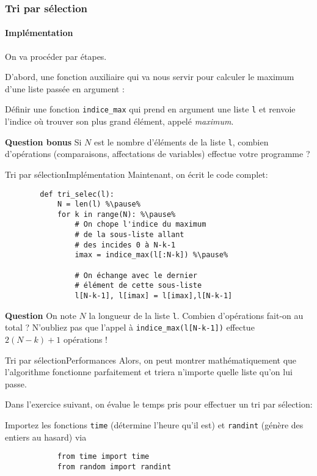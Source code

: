 \begin{frame}
	\frametitle{Tri par sélection}
	\framesubtitle{Implémentation}
	
	On va procéder par étapes.\pause
	
	D'abord, une fonction auxiliaire qui va nous servir pour calculer le maximum d'une liste passée en argument :\pause
	
	\begin{exo}
		Définir une fonction \lstinline|indice_max| qui prend en argument une liste \lstinline|l| et renvoie l'indice où trouver son plus grand élément, appelé \textit{maximum}.
		
		\textbf{Question bonus} Si $N$ est le nombre d'éléments de la liste \lstinline|l|, combien d'opérations (comparaisons, affectations de variables) effectue votre programme ?
	\end{exo}
\end{frame}

\begin{frame}[fragile]{Tri par sélection}{Implémentation}
	Maintenant, on écrit le code complet:\pause
	
	\begin{lstlisting}
		def tri_selec(l):
			N = len(l) %\pause%
			for k in range(N): %\pause%
				# On chope l'indice du maximum
				# de la sous-liste allant
				# des incides 0 à N-k-1
				imax = indice_max(l[:N-k]) %\pause%
				
				# On échange avec le dernier
				# élément de cette sous-liste
				l[N-k-1], l[imax] = l[imax],l[N-k-1]
	\end{lstlisting}
	
	\textbf{Question} On note $N$ la longueur de la liste \lstinline|l|. Combien d'opérations fait-on au total ? N'oubliez pas que l'appel à \lstinline|indice_max(l[N-k-1])| effectue $2(N-k)+1$ opérations ! 
\end{frame}

\begin{frame}[fragile]{Tri par sélection}{Performances}
	Alors, on peut montrer mathématiquement que l'algorithme fonctionne parfaitement et triera n'importe quelle liste qu'on lui passe.\pause
	
	Dans l'exercice suivant, on évalue le temps pris pour effectuer un tri par sélection:\pause
	
	\begin{exo}
		Importez les fonctions \lstinline|time| (détermine l'heure qu'il est) et \lstinline|randint| (génère des entiers au hasard) via \begin{lstlisting}
			from time import time
			from random import randint
		\end{lstlisting}
	\end{exo}	
\end{frame}

